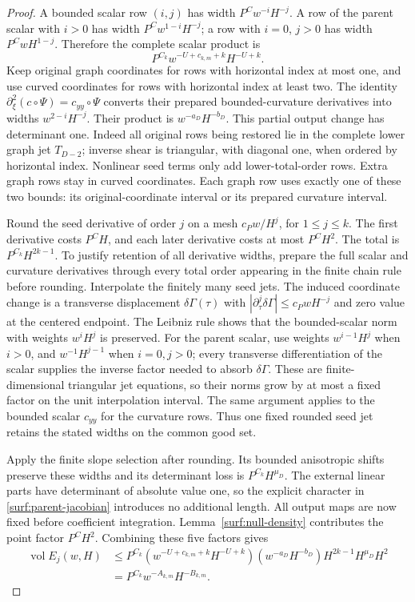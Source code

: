 \documentclass[11pt]{amsart}
\theoremstyle{definition}
\theoremstyle{remark}
\numberwithin{equation}{section}
\begin{document}
\begin{proof}
A bounded scalar row $(i,j)$ has width $P^Cw^{-i}H^{-j}$. A row of the parent scalar with $i>0$ has width $P^Cw^{1-i}H^{-j}$; a row with $i=0$, $j>0$ has width $P^CwH^{1-j}$. Therefore the complete scalar product is
\[
P^{C_k}w^{-U+c_{k,m}+k}H^{-U+k}.
\]
Keep original graph coordinates for rows with horizontal index at most one, and use curved coordinates for rows with horizontal index at least two. The identity $\partial_\xi^2(c\circ\Psi)=c_{yy}\circ\Psi$ converts their prepared bounded-curvature derivatives into widths $w^{2-i}H^{-j}$. Their product is $w^{-a_D}H^{-b_D}$. This partial output change has determinant one. Indeed all original rows being restored lie in the complete lower graph jet $T_{D-2}$; inverse shear is triangular, with diagonal one, when ordered by horizontal index. Nonlinear seed terms only add lower-total-order rows. Extra graph rows stay in curved coordinates. Each graph row uses exactly one of these two bounds: its original-coordinate interval or its prepared curvature interval.

Round the seed derivative of order $j$ on a mesh $c_Pw/H^j$, for $1\le j\le k$. The first derivative costs $P^CH$, and each later derivative costs at most $P^CH^2$. The total is $P^{C_k}H^{2k-1}$. To justify retention of all derivative widths, prepare the full scalar and curvature derivatives through every total order appearing in the finite chain rule before rounding. Interpolate the finitely many seed jets. The induced coordinate change is a transverse displacement $\delta\Gamma(\tau)$ with $|\partial_\tau^j\delta\Gamma|\le c_PwH^{-j}$ and zero value at the centered endpoint. The Leibniz rule shows that the bounded-scalar norm with weights $w^iH^j$ is preserved. For the parent scalar, use weights $w^{i-1}H^j$ when $i>0$, and $w^{-1}H^{j-1}$ when $i=0,j>0$; every transverse differentiation of the scalar supplies the inverse factor needed to absorb $\delta\Gamma$. These are finite-dimensional triangular jet equations, so their norms grow by at most a fixed factor on the unit interpolation interval. The same argument applies to the bounded scalar $c_{yy}$ for the curvature rows. Thus one fixed rounded seed jet retains the stated widths on the common good set.

Apply the finite slope selection after rounding. Its bounded anisotropic shifts preserve these widths and its determinant loss is $P^{C_k}H^{\mu_D}$. The external linear parts have determinant of absolute value one, so the explicit character in \eqref{surf:parent-jacobian} introduces no additional length. All output maps are now fixed before coefficient integration. Lemma~\ref{surf:null-density} contributes the point factor $P^CH^2$. Combining these five factors gives
\[
\begin{aligned}
\operatorname{vol}E_j(w,H)&\le P^{C_k}(w^{-U+c_{k,m}+k}H^{-U+k})(w^{-a_D}H^{-b_D})H^{2k-1}H^{\mu_D}H^2\\
&=P^{C_k}w^{-A_{k,m}}H^{-B_{k,m}}.
\end{aligned}
\]


\end{proof}
\end{document}
